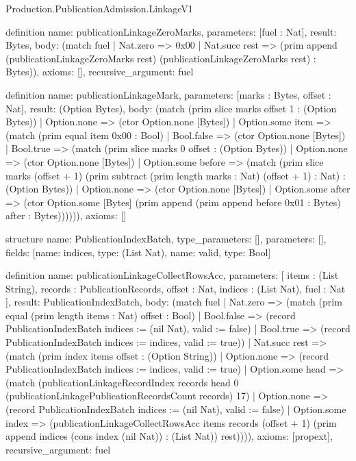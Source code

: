 \begin{lexlean}{Production.PublicationAdmission.LinkageV1}
\begin{semanticmodule}
definition{
  name: publicationLinkageZeroMarks,
  parameters: [fuel : Nat],
  result: Bytes,
  body: (match fuel
    | Nat.zero => 0x00
    | Nat.succ rest => (prim append (publicationLinkageZeroMarks rest) (publicationLinkageZeroMarks rest) : Bytes)),
  axioms: [],
  recursive_argument: fuel
}

definition{
  name: publicationLinkageMark,
  parameters: [marks : Bytes, offset : Nat],
  result: (Option Bytes),
  body: (match (prim slice marks offset 1 : (Option Bytes))
    | Option.none => (ctor Option.none [Bytes])
    | Option.some item => (match (prim equal item 0x00 : Bool)
      | Bool.false => (ctor Option.none [Bytes])
      | Bool.true => (match (prim slice marks 0 offset : (Option Bytes))
        | Option.none => (ctor Option.none [Bytes])
        | Option.some before => (match (prim slice marks (offset + 1) (prim subtract (prim length marks : Nat) (offset + 1) : Nat) : (Option Bytes))
          | Option.none => (ctor Option.none [Bytes])
          | Option.some after => (ctor Option.some [Bytes] (prim append (prim append before 0x01 : Bytes) after : Bytes)))))),
  axioms: []
}

structure{
  name: PublicationIndexBatch,
  type_parameters: [],
  parameters: [],
  fields: [{name: indices, type: (List Nat)}, {name: valid, type: Bool}]
}

definition{
  name: publicationLinkageCollectRowsAcc,
  parameters: [
    items : (List String),
    records : PublicationRecords,
    offset : Nat,
    indices : (List Nat),
    fuel : Nat
  ],
  result: PublicationIndexBatch,
  body: (match fuel
    | Nat.zero => (match (prim equal (prim length items : Nat) offset : Bool)
      | Bool.false => (record PublicationIndexBatch {indices := (nil Nat), valid := false})
      | Bool.true => (record PublicationIndexBatch {indices := indices, valid := true}))
    | Nat.succ rest => (match (prim index items offset : (Option String))
      | Option.none => (record PublicationIndexBatch {indices := indices, valid := true})
      | Option.some head => (match (publicationLinkageRecordIndex records head 0 (publicationLinkagePublicationRecordsCount records) 17)
        | Option.none => (record PublicationIndexBatch {indices := (nil Nat), valid := false})
        | Option.some index => (publicationLinkageCollectRowsAcc items records (offset + 1) (prim append indices (cons index (nil Nat)) : (List Nat)) rest)))),
  axioms: [propext],
  recursive_argument: fuel
}


\end{semanticmodule}
\end{lexlean}
